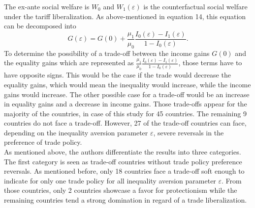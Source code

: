 The ex-ante social welfare is \(W_{0}\) and \(W_{1}(\varepsilon)\) is the counterfactual social welfare under the tariff liberalization.
As above-mentioned in equation 14, this equation can be decomposed into 
\begin{equation} \label{eq:equation17}
    G(\varepsilon)= G(0) + \frac{\mu_{1}}{\mu_{0}} \frac{I_{0}(\varepsilon)-I_{1}(\varepsilon)}{1-I_{0}(\varepsilon)}.
\end{equation}
To determine the possibility of a trade-off between the income gains \(G(0)\) and the equality gains which are represented as 
\(\frac{\mu_{1}}{\mu_{0}} \frac{I_{0}(\varepsilon)-I_{1}(\varepsilon)}{1-I_{0}(\varepsilon)}\), those terms have to have
opposite signs. This would be the case if the trade would decrease the equality gains, which would mean the inequality would
increase, while the income gains would increase. The other possible case for a trade-off would be an increase in equality gains
and a decrease in income gains. Those trade-offs appear for the majority of the countries, in case of this study for 45 countries.
The remaining 9 countries do not face a trade-off. However, 27 of the trade-off countries can face, depending on the inequality
aversion parameter \(\varepsilon\), severe reversals in the preference of trade policy. \\

As mentioned above, the authors differentiate the results into three categories. The first category is seen as trade-off
countries without trade policy preference reversals. As mentioned before, only 18 countries face a trade-off soft enough to 
indicate for only one trade policy for all inequality aversion parameter \(\varepsilon\). From those countries, only 2 countries
showcase a favor for protectionism while the remaining countries tend a strong domination in regard of a trade liberalization.


